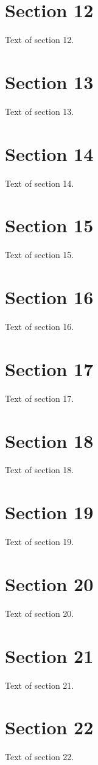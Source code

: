 \documentclass{article}
\begin{document}
\section{Section 12}
Text of section 12.

\section{Section 13}
Text of section 13.

\section{Section 14}
Text of section 14.

\section{Section 15}
Text of section 15.

\section{Section 16}
Text of section 16.

\section{Section 17}
Text of section 17.

\section{Section 18}
Text of section 18.

\section{Section 19}
Text of section 19.

\section{Section 20}
Text of section 20.

\section{Section 21}
Text of section 21.

\section{Section 22}
Text of section 22.
\end{document}
